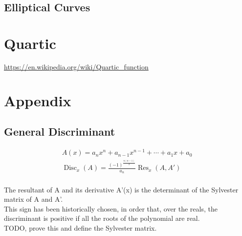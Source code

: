 \documentclass[a4paper]{article}
\begin{document}
\subsection{Elliptical Curves}\label{subsec:elliptical-curves}

\section{Quartic}\label{sec:quartic}
\url{https://en.wikipedia.org/wiki/Quartic_function}

\section{Appendix}\label{sec:appendix}

\subsection{General Discriminant}\label{subsec:general-discriminant}

\begin{gather*}
    A(x) = a_{n}x^n+a_{n-1}x^{n-1}+\cdots+a_{1}x+a_0\\
    \operatorname{Disc}_x(A) = \frac{(-1)^{\frac{n(n-1)}{2}}} {a_n}\operatorname{Res}_x(A,A')\\
\end{gather*}

The resultant of A and its derivative A'(x) is the determinant of the Sylvester matrix of A and A'.
\\
This sign has been historically chosen, in order that, over the reals, the discriminant is positive if all the roots of the polynomial are real.
\\
TODO, prove this and define the Sylvester matrix.
\end{document}
